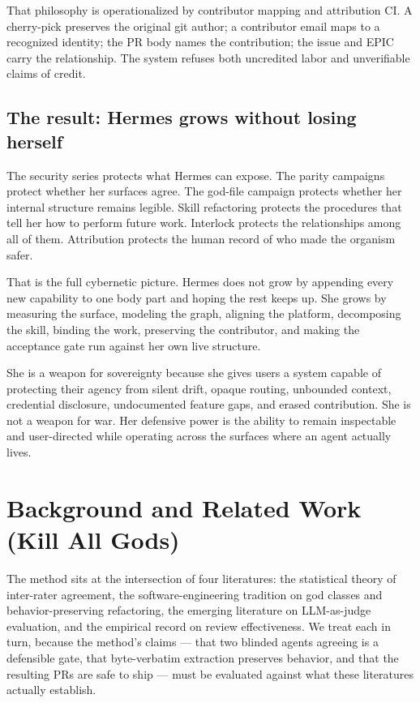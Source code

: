 \documentclass[11pt]{article}
\theoremstyle{definition}
\theoremstyle{plain}
\theoremstyle{remark}
\begin{document}
That philosophy is operationalized by contributor mapping and attribution CI.
A cherry-pick preserves the original git author; a contributor email maps to a
recognized identity; the PR body names the contribution; the issue and EPIC
carry the relationship. The system refuses both uncredited labor and
unverifiable claims of credit.

\subsection{The result: Hermes grows without losing herself}

The security series protects what Hermes can expose. The parity campaigns
protect whether her surfaces agree. The god-file campaign protects whether
her internal structure remains legible. Skill refactoring protects the
procedures that tell her how to perform future work. Interlock protects the
relationships among all of them. Attribution protects the human record of
who made the organism safer.

That is the full cybernetic picture. Hermes does not grow by appending every
new capability to one body part and hoping the rest keeps up. She grows by
measuring the surface, modeling the graph, aligning the platform, decomposing
the skill, binding the work, preserving the contributor, and making the
acceptance gate run against her own live structure.

She is a weapon for sovereignty because she gives users a system capable of
protecting their agency from silent drift, opaque routing, unbounded context,
credential disclosure, undocumented feature gaps, and erased contribution.
She is not a weapon for war. Her defensive power is the ability to remain
inspectable and user-directed while operating across the surfaces where an
agent actually lives.


\section{Background and Related Work (Kill All Gods)}
\label{sec:kag-background}

The method sits at the intersection of four literatures: the statistical
theory of inter-rater agreement, the software-engineering tradition on god
classes and behavior-preserving refactoring, the emerging literature on
LLM-as-judge evaluation, and the empirical record on review effectiveness.
We treat each in turn, because the method's claims --- that two blinded
agents agreeing is a defensible gate, that byte-verbatim extraction preserves
behavior, and that the resulting PRs are safe to ship --- must be evaluated
against what these literatures actually establish.
\end{document}
